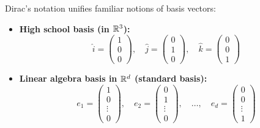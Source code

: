 \begin{example}
Dirac's notation unifies familiar notions of basis vectors:

\begin{itemize}
    \item \textbf{High school basis (in $\mathbb{R}^3$):}
    \[
        \hat{i} = \begin{pmatrix} 1 \\ 0 \\ 0 \end{pmatrix},\quad
        \hat{j} = \begin{pmatrix} 0 \\ 1 \\ 0 \end{pmatrix},\quad
        \hat{k} = \begin{pmatrix} 0 \\ 0 \\ 1 \end{pmatrix}
    \]

    \item \textbf{Linear algebra basis in $\mathbb{R}^d$ (standard basis):}
    \[
        e_1 = \begin{pmatrix} 1 \\ 0 \\ \vdots \\ 0 \end{pmatrix},\quad
        e_2 = \begin{pmatrix} 0 \\ 1 \\ \vdots \\ 0 \end{pmatrix},\quad
        \ldots,\quad
        e_d = \begin{pmatrix} 0 \\ 0 \\ \vdots \\ 1 \end{pmatrix}
    \]


\end{itemize}
\end{example}
